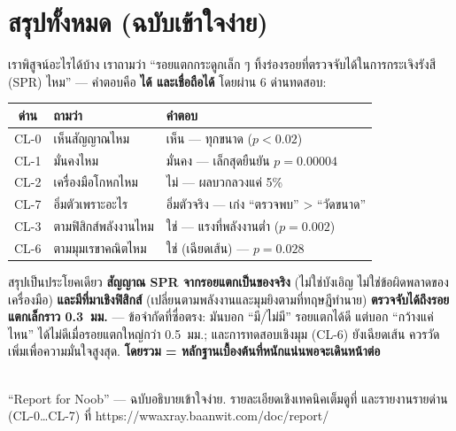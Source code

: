 \documentclass[17pt]{extarticle}
\newcommand{\code}[1]{{\ttfamily\detokenize{#1}}}
\begin{document}
\clearpage
\section{สรุปทั้งหมด (ฉบับเข้าใจง่าย)}
\begin{concept}{เราพิสูจน์อะไรได้บ้าง}
เราถามว่า ``รอยแตกกระดูกเล็ก ๆ ทิ้งร่องรอยที่ตรวจจับได้ในการกระเจิงรังสี (SPR) ไหม'' --- คำตอบคือ
\textbf{ได้ และเชื่อถือได้} โดยผ่าน 6 ด่านทดสอบ:
\end{concept}
\renewcommand{\arraystretch}{1.3}\small
\begin{center}
\begin{tabular}{c l l}
\rowcolor{theme}\color{white}\textbf{ด่าน} & \color{white}\textbf{ถามว่า} & \color{white}\textbf{คำตอบ} \\
\midrule
CL-0 & เห็นสัญญาณไหม & \textcolor{ok}{เห็น --- ทุกขนาด ($p<0.02$)} \\
\rowcolor{softgray}
CL-1 & มั่นคงไหม & \textcolor{ok}{มั่นคง --- เล็กสุดยืนยัน $p=0.00004$} \\
CL-2 & เครื่องมือโกหกไหม & \textcolor{ok}{ไม่ --- ผลบวกลวงแค่ 5\%} \\
\rowcolor{softgray}
CL-7 & อิ่มตัวเพราะอะไร & \textcolor{ok}{อิ่มตัวจริง --- เก่ง ``ตรวจพบ'' > ``วัดขนาด''} \\
CL-3 & ตามฟิสิกส์พลังงานไหม & \textcolor{ok}{ใช่ --- แรงที่พลังงานต่ำ ($p=0.002$)} \\
\rowcolor{softgray}
CL-6 & ตามมุมเรขาคณิตไหม & \textcolor{warn}{ใช่ (เฉียดเส้น) --- $p=0.028$} \\
\bottomrule
\end{tabular}
\end{center}
\normalsize
\vspace{4pt}
\begin{concept}{สรุปเป็นประโยคเดียว}
\textbf{สัญญาณ SPR จากรอยแตกเป็นของจริง} (ไม่ใช่บังเอิญ ไม่ใช่ข้อผิดพลาดของเครื่องมือ) \textbf{และมีที่มาเชิงฟิสิกส์}
(เปลี่ยนตามพลังงานและมุมยิงตามที่ทฤษฎีทำนาย) \textbf{ตรวจจับได้ถึงรอยแตกเล็กราว 0.3~มม.} --- ข้อจำกัดที่ซื่อตรง:
มันบอก ``มี/ไม่มี'' รอยแตกได้ดี แต่บอก ``กว้างแค่ไหน'' ได้ไม่ดีเมื่อรอยแตกใหญ่กว่า 0.5~มม.; และการทดสอบเชิงมุม
(CL-6) ยังเฉียดเส้น ควรวัดเพิ่มเพื่อความมั่นใจสูงสุด. \textbf{โดยรวม = หลักฐานเบื้องต้นที่หนักแน่นพอจะเดินหน้าต่อ}
\end{concept}

\vfill
\noindent{\color{theme!45}\rule{\linewidth}{0.4pt}}\\
{\small\color{ink} ``Report for Noob'' --- ฉบับอธิบายเข้าใจง่าย. รายละเอียดเชิงเทคนิคเต็มดูที่ \code{final_report.pdf}
และรายงานรายด่าน (CL-0…CL-7) ที่ https://wwaxray.baanwit.com/doc/report/}
\end{document}
